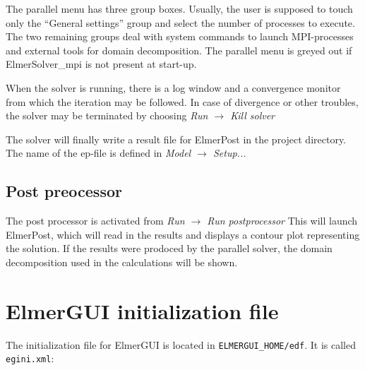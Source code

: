 \documentclass[a4paper,12pt]{article}
\newcommand{\menu}[2]{{\it \vskip2mm #1 $\rightarrow$ #2 \vskip2mm}}
\begin{document}
The parallel menu has three group boxes. Usually, the user is supposed to touch
only the ``General settings'' group and select the number of processes to execute.
The two remaining groups deal with system commands to launch MPI-processes and
external tools for domain decomposition.  The parallel menu is greyed out if
ElmerSolver\_mpi is not present at start-up.

When the solver is running, there is a log window and a convergence monitor
from which the iteration may be followed. In case of divergence or other troubles,
the solver may be terminated by choosing
\menu{Run}{Kill solver}

The solver will finally write a result file for ElmerPost in the project directory.
The name of the ep-file is defined in
\menu{Model}{Setup...}

\subsection{Post preocessor}

The post processor is activated from
\menu{Run}{Run postprocessor}
\noindent This will launch ElmerPost, which will read in the results and displays
a contour plot representing the solution. If the results were prodoced by the parallel solver, the domain decomposition used in the calculations will be shown.





\appendix

\section{ElmerGUI initialization file}

The initialization file for ElmerGUI is located in {\tt ELMERGUI\_HOME/edf}. It is called {\tt egini.xml}:
\end{document}

